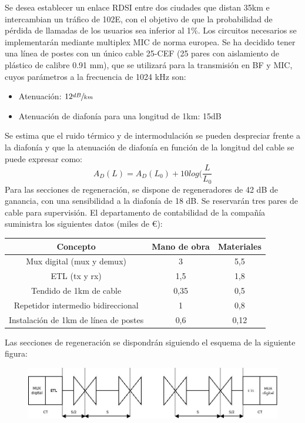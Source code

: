 \begin{exercise}[7]
	Se desea establecer un enlace RDSI entre dos ciudades que distan 35km e intercambian un tráfico de 102E, con el objetivo de que la probabilidad de pérdida de llamadas de los usuarios sea inferior al 1\%. Los circuitos necesarios se implementarán mediante multiplex MIC de norma europea. Se ha decidido tener una línea de postes con un único cable 25-CEF (25 pares con aislamiento de plástico de calibre 0.91 mm), que se utilizará para la transmisión en BF y MIC, cuyos parámetros a la frecuencia de 1024 kHz son:
\begin{itemize}
	\item Atenuación: $12\sfrac{dB}{km}$
	\item Atenuación de diafonía para una longitud de 1km: 15dB
\end{itemize}
Se estima que el ruido térmico y de intermodulación se pueden despreciar frente a la diafonía y que la atenuación de diafonía en función de la longitud del cable se puede expresar como:
\[A_D(L)=A_D(L_0)+10log(\frac{L}{L_0}\]
Para las secciones de regeneración, se dispone de regeneradores de 42 dB de ganancia, con una sensibilidad a la diafonía de 18 dB. Se reservarán tres pares de cable para supervisión. El departamento de contabilidad de la compañía suministra los siguientes datos (miles de €):
\begin{center}
\begin{tabular}{c c c}
	\hline
	\textbf{Concepto} & \textbf{Mano de obra} & \textbf{Materiales}\\\hline
	Mux digital (mux y demux) & 3 & 5,5\\
	ETL (tx y rx) & 1,5 & 1,8\\
	Tendido de 1km de cable & 0,35 & 0,5\\
	Repetidor intermedio bidireccional & 1 & 0,8\\
	Instalación de 1km de línea de postes & 0,6 & 0,12\\\hline
\end{tabular}
\end{center}
Las secciones de regeneración se dispondrán siguiendo el esquema de la siguiente figura:
\begin{figure}[htp]
\centering
\includegraphics[width=\textwidth]{Imagen/ejercicio7tema3.jpg}

\end{figure}
\end{exercise}
